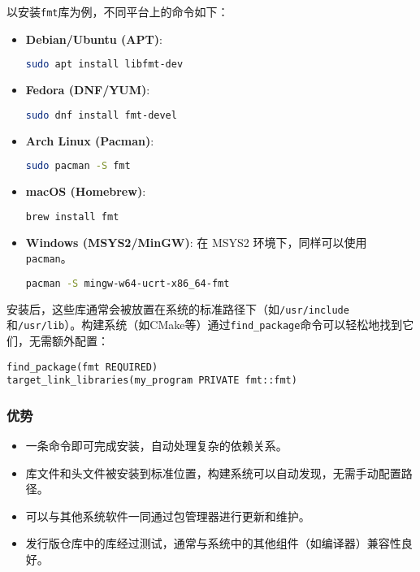 \documentclass[../main]{subfiles}
\begin{document}
以安装\texttt{fmt}库为例，不同平台上的命令如下：

\begin{itemize}
  \item \textbf{Debian/Ubuntu (APT)}:
    \begin{lstlisting}[language=bash]
sudo apt install libfmt-dev
    \end{lstlisting}
  \item \textbf{Fedora (DNF/YUM)}:
    \begin{lstlisting}[language=bash]
sudo dnf install fmt-devel
    \end{lstlisting}
  \item \textbf{Arch Linux (Pacman)}:
    \begin{lstlisting}[language=bash]
sudo pacman -S fmt
    \end{lstlisting}
  \item \textbf{macOS (Homebrew)}:
    \begin{lstlisting}[language=bash]
brew install fmt
    \end{lstlisting}
  \item \textbf{Windows (MSYS2/MinGW)}: 在 MSYS2 环境下，同样可以使用 \texttt{pacman}。
    \begin{lstlisting}[language=bash]
pacman -S mingw-w64-ucrt-x86_64-fmt
    \end{lstlisting}
\end{itemize}

安装后，这些库通常会被放置在系统的标准路径下（如\texttt{/usr/include}和\texttt{/usr/lib}）。构建系统（如CMake等）通过\texttt{find\_package}命令可以轻松地找到它们，无需额外配置：
\begin{lstlisting}
find_package(fmt REQUIRED)
target_link_libraries(my_program PRIVATE fmt::fmt)
\end{lstlisting}

\subsubsection{优势}
\begin{itemize}
  \item 一条命令即可完成安装，自动处理复杂的依赖关系。
  \item 库文件和头文件被安装到标准位置，构建系统可以自动发现，无需手动配置路径。
  \item 可以与其他系统软件一同通过包管理器进行更新和维护。
  \item 发行版仓库中的库经过测试，通常与系统中的其他组件（如编译器）兼容性良好。
\end{itemize}
\end{document}
